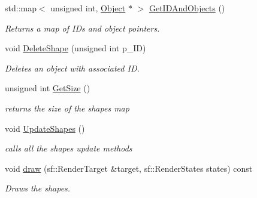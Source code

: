 \begin{DoxyCompactItemize}
\mbox{\label{class_shapes_a0de59bfbb215384f9027301817bcd4a1}} 
std\+::map$<$ unsigned int, \hyperlink{class_object}{Object} $\ast$ $>$ \hyperlink{class_shapes_a0de59bfbb215384f9027301817bcd4a1}{Get\+I\+D\+And\+Objects} ()
\begin{DoxyCompactList}\small\item\em Returns a map of I\+Ds and object pointers. \end{DoxyCompactList}\item 
\mbox{\label{class_shapes_a7dbae8132686e181679f4a543b0dc128}} 
void \hyperlink{class_shapes_a7dbae8132686e181679f4a543b0dc128}{Delete\+Shape} (unsigned int p\+\_\+\+ID)
\begin{DoxyCompactList}\small\item\em Deletes an object with associated ID. \end{DoxyCompactList}\item 
\mbox{\label{class_shapes_a4cb9b0b2e974c63e3182103626b582a4}} 
unsigned int \hyperlink{class_shapes_a4cb9b0b2e974c63e3182103626b582a4}{Get\+Size} ()
\begin{DoxyCompactList}\small\item\em returns the size of the shapes\textquotesingle{} map \end{DoxyCompactList}\item 
\mbox{\label{class_shapes_aab0b2aa58534e707e13f8651f5a6e55d}} 
void \hyperlink{class_shapes_aab0b2aa58534e707e13f8651f5a6e55d}{Update\+Shapes} ()
\begin{DoxyCompactList}\small\item\em calls all the shapes update methods \end{DoxyCompactList}\item 
\mbox{\label{class_shapes_a5d0ed4de4f10f3a81f2eff482550c448}} 
void \hyperlink{class_shapes_a5d0ed4de4f10f3a81f2eff482550c448}{draw} (sf\+::\+Render\+Target \&target, sf\+::\+Render\+States states) const
\begin{DoxyCompactList}\small\item\em Draws the shapes. \end{DoxyCompactList}\end{DoxyCompactItemize}

